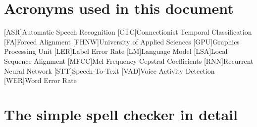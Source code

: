 \section*{Acronyms used in this document}

\begin{acronym}[Bash]
	[ASR]{Automatic Speech Recognition}
	[CTC]{Connectionist Temporal Classification}
	[FA]{Forced Alignment}
	[FHNW]{University of Applied Sciences}
	[GPU]{Graphics Processing Unit}
	[LER]{Label Error Rate}
	[LM]{Language Model}
	[LSA]{Local Sequence Alignment}
	[MFCC]{Mel-Frequency Cepstral Coefficients}
	[RNN]{Recurrent Neural Network}
	[STT]{Speech-To-Text}
	[VAD]{Voice Activity Detection}
	[WER]{Word Error Rate}
\end{acronym}

\section*{The simple spell checker in detail}

